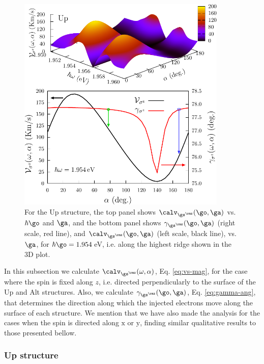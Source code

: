 \documentclass[floatfix,prb,aps,superscriptaddress,showpacs,11pt,preprint,letterpaper]{revtex4}
\def\tama{10cm}
\begin{document}
\begin{figure}[t]
\centering
\includegraphics[width=\tama]{upplots/up-vsz-w2}
\caption{For the Up structure, the top panel shows $\calv_{\gs^\rmz} (\go,\ga)$
vs. $\hbar\go$ and $\ga$, and the bottom panel shows $\gamma_{\gs^\rmz}
(\go,\ga)$ (right scale, red line), and $\calv_{\gs^\rmz} (\go,\ga)$ (left
scale, black line), vs. $\ga$, for $\hbar\go=1.954$\,eV, i.e. along the
highest ridge shown in the 3D plot. }
\label{fig:up-vsz-w2}
\end{figure}

In this subsection we calculate $\calv_{\gs^\rmz}(\omega,\alpha)$, Eq.
\eqref{eq:vs-mag}, for the case where the spin is fixed along $z$, i.e.
directed perpendicularly to the surface of the Up and Alt structures. Also, we
calculate $\gamma_{\gs^\rmz}(\go,\ga)$, Eq. \eqref{eq:gamma-ang}, that
determines the direction along which the injected electrons move along the
surface of  each structure. We mention that we have also made the analysis for
the cases when the spin  is directed along $\mathrm{x}$ or $\mathrm{y}$,
finding similar qualitative results to those presented bellow.
% 

\subsubsection{Up structure}\label{up:fs}
\end{document}

